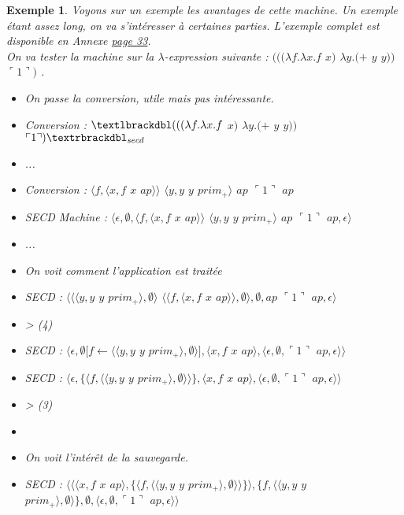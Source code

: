 \documentclass[10pt,a4paper]{report}
\newtheorem{ex}{Exemple}
\begin{document}
\begin{ex}
	Voyons sur un exemple les avantages de cette machine. Un exemple étant assez long, on va s'intéresser à certaines parties. L'exemple complet est disponible en Annexe \hyperref[SECD]{page 33}. 
	\\
	On va tester la machine sur la $\lambda$-expression suivante : $(((\lambda f.\lambda x.f$ $x)$ $\lambda y.(+$ $y$ $y))$ $\ulcorner 1\urcorner)$ .
	\bigbreak
	
	\begin{itemize}
		\item[] On passe la conversion, utile mais pas intéressante.
		\item[] Conversion : $\textlbrackdbl(((\lambda f.\lambda x.f$ $x)$ $\lambda y.(+$ $y$ $y))$ $\ulcorner 1\urcorner)\textrbrackdbl_{secd}$
		\item[] ...
		\item[] Conversion : $\langle f,\langle x,f$ $x$ $ap\rangle\rangle$ $\langle y,y$ $y$ $prim_{+}\rangle$ $ap$ $\ulcorner 1\urcorner$ $ap$
		\item[] SECD Machine : $\langle\epsilon,\emptyset,\langle f,\langle x,f$ $x$ $ap\rangle\rangle$ $\langle y,y$ $y$ $prim_{+}\rangle$ $ap$ $\ulcorner 1\urcorner$ $ap,\epsilon\rangle$ 
		\item[] ...
		\item[] On voit comment l'application est traitée
		\item[] SECD : $\langle\langle\langle y,y$ $y$ $prim_{+}\rangle,\emptyset\rangle$ $\langle\langle f,\langle x,f$ $x$ $ap\rangle\rangle,\emptyset\rangle,\emptyset,ap$ $\ulcorner 1\urcorner$ $ap,\epsilon\rangle$
		\item[] > (4)
		\item[] SECD : $\langle\epsilon,\emptyset[f \leftarrow \langle\langle y,y$ $y$ $prim_{+}\rangle,\emptyset\rangle],\langle x,f$ $x$ $ap\rangle,\langle\epsilon,\emptyset,\ulcorner 1\urcorner$ $ap,\epsilon\rangle\rangle$
		\item[] SECD : $\langle\epsilon,\{\langle f,\langle\langle y,y$ $y$ $prim_{+}\rangle,\emptyset\rangle\rangle\},\langle x,f$ $x$ $ap\rangle,\langle\epsilon,\emptyset,\ulcorner 1\urcorner$ $ap,\epsilon\rangle\rangle$
		\item[] >  (3)
		\item[] 
		\item[] On voit l'intérêt de la sauvegarde.
		\item[] SECD : $\langle\langle\langle x,f$ $x$ $ap\rangle,\{\langle f,\langle\langle y,y$ $y$ $prim_{+}\rangle,\emptyset\rangle\rangle\}\rangle,\{f,\langle\langle y,y$ $y$ $prim_{+}\rangle,\emptyset\rangle\},\emptyset,\langle\epsilon,\emptyset,\ulcorner 1\urcorner$ $ap,\epsilon\rangle\rangle$

\end{itemize}
\end{ex}
\end{document}

